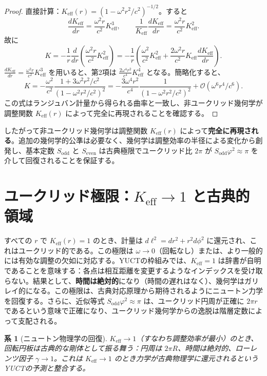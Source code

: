 \documentclass[12pt,a4paper]{article}
\newtheorem{corollary}{系}[section]
\newcommand{\Sodd}{S_{\mathrm{odd}}}
\newcommand{\Seven}{S_{\mathrm{even}}}
\begin{document}
	\begin{proof}
		直接計算：\(K_{\mathrm{eff}}(r) = (1 - \omega^2 r^2/c^2)^{-1/2}\)。すると
		\[
		\frac{dK_{\mathrm{eff}}}{dr} = \frac{\omega^2 r}{c^2} K_{\mathrm{eff}}^3,\qquad
		\frac{1}{K_{\mathrm{eff}}} \frac{dK_{\mathrm{eff}}}{dr} = \frac{\omega^2 r}{c^2} K_{\mathrm{eff}}^2.
		\]
		故に
		\[
		K = -\frac{1}{r} \frac{d}{dr}\left( \frac{\omega^2 r}{c^2} K_{\mathrm{eff}}^2 \right) = -\frac{1}{r} \left( \frac{\omega^2}{c^2} K_{\mathrm{eff}}^2 + \frac{2\omega^2 r}{c^2} K_{\mathrm{eff}} \frac{dK_{\mathrm{eff}}}{dr} \right).
		\]
		\(\frac{dK_{\mathrm{eff}}}{dr} = \frac{\omega^2 r}{c^2} K_{\mathrm{eff}}^3\) を用いると、第2項は \(\frac{2\omega^4 r^2}{c^4} K_{\mathrm{eff}}^4\) となる。簡略化すると、
		\[
		K = -\frac{\omega^2}{c^2} \frac{1 + 3\omega^2 r^2/c^2}{(1 - \omega^2 r^2/c^2)^2} = -\frac{3\omega^4 r^2}{c^4} \frac{1}{(1 - \omega^2 r^2/c^2)^2} + \mathcal{O}(\omega^6 r^4/c^6).
		\]
		この式はランジュバン計量から得られる曲率と一致し、非ユークリッド幾何学が調整関数 \(K_{\mathrm{eff}}(r)\) によって完全に再現されることを確認する。
	\end{proof}
	
	したがって非ユークリッド幾何学は調整関数 \(K_{\mathrm{eff}}(r)\) によって\textbf{完全に再現される}。追加の幾何学的公準は必要なく、幾何学は調整効率の半径による変化から創発し、基本定数 \(\Sodd\) と \(\Seven\) は古典極限でユークリッド比 \(2\pi\) が \(\Sodd \varphi^2 \approx \pi\) を介して回復されることを保証する。
	
	\section{ユークリッド極限：\(K_{\mathrm{eff}} \to 1\) と古典的領域}
	\label{sec:euc-limit}
	
	すべての \(r\) で \(K_{\mathrm{eff}}(r) = 1\) のとき、計量は \(d\ell^2 = dr^2 + r^2 d\phi^2\) に還元され、これはユークリッド的である。この極限は \(\omega \to 0\)（回転なし）または、より一般的には有効な調整の欠如に対応する。YUCTの枠組みでは、\(K_{\mathrm{eff}} = 1\) は辞書が自明であることを意味する：各点は相互距離を変更するようなインデックスを受け取らない。結果として、\textbf{時間は絶対的}になり（時間の遅れはなく）、幾何学はガリレイ的になる。この極限は、古典対応原理から期待されるようにニュートン力学を回復する。さらに、近似等式 \(\Sodd \varphi^2 \approx \pi\) は、ユークリッド円周が正確に \(2\pi r\) であるという意味で正確になり、ユークリッド幾何学からの逸脱は階層定数によって支配される。
	
	\begin{corollary}[ニュートン物理学の回復]
		\(K_{\mathrm{eff}} \to 1\)（すなわち調整効率が最小）のとき、回転円板は古典的な剛体として振る舞う：円周は \(2\pi R\)、時間は絶対的、ローレンツ因子 \(\gamma \to 1\)。これは \(K_{\mathrm{eff}} \to 1\) のとき力学が古典物理学に還元されるというYUCTの予測と整合する。
	\end{corollary}
	
\end{document}
